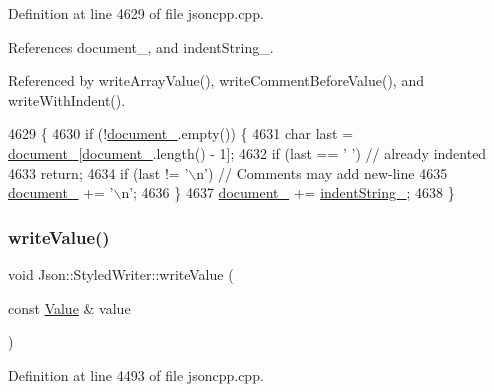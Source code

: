 Definition at line 4629 of file jsoncpp.\+cpp.



References document\+\_\+, and indent\+String\+\_\+.



Referenced by write\+Array\+Value(), write\+Comment\+Before\+Value(), and write\+With\+Indent().


\begin{DoxyCode}
4629                                \{
4630   \textcolor{keywordflow}{if} (!\hyperlink{class_json_1_1_styled_writer_ae967b0c77e4d7cb889ce7b6ee4ce28d7}{document\_}.empty()) \{
4631     \textcolor{keywordtype}{char} last = \hyperlink{class_json_1_1_styled_writer_ae967b0c77e4d7cb889ce7b6ee4ce28d7}{document\_}[\hyperlink{class_json_1_1_styled_writer_ae967b0c77e4d7cb889ce7b6ee4ce28d7}{document\_}.length() - 1];
4632     \textcolor{keywordflow}{if} (last == \textcolor{charliteral}{' '}) \textcolor{comment}{// already indented}
4633       \textcolor{keywordflow}{return};
4634     \textcolor{keywordflow}{if} (last != \textcolor{charliteral}{'\(\backslash\)n'}) \textcolor{comment}{// Comments may add new-line}
4635       \hyperlink{class_json_1_1_styled_writer_ae967b0c77e4d7cb889ce7b6ee4ce28d7}{document\_} += \textcolor{charliteral}{'\(\backslash\)n'};
4636   \}
4637   \hyperlink{class_json_1_1_styled_writer_ae967b0c77e4d7cb889ce7b6ee4ce28d7}{document\_} += \hyperlink{class_json_1_1_styled_writer_a7d91709c94c152bd44eaf80faac130ae}{indentString\_};
4638 \}
\end{DoxyCode}
\mbox{\label{class_json_1_1_styled_writer_ac40143cf43f7c4a94d3d0b41e5245069}} 
\subsubsection{\texorpdfstring{write\+Value()}{writeValue()}}
{\footnotesize\ttfamily void Json\+::\+Styled\+Writer\+::write\+Value (\begin{DoxyParamCaption}\item[{const \hyperlink{class_json_1_1_value}{Value} \&}]{value }\end{DoxyParamCaption})\hspace{0.3cm}{\ttfamily [private]}}



Definition at line 4493 of file jsoncpp.\+cpp.



